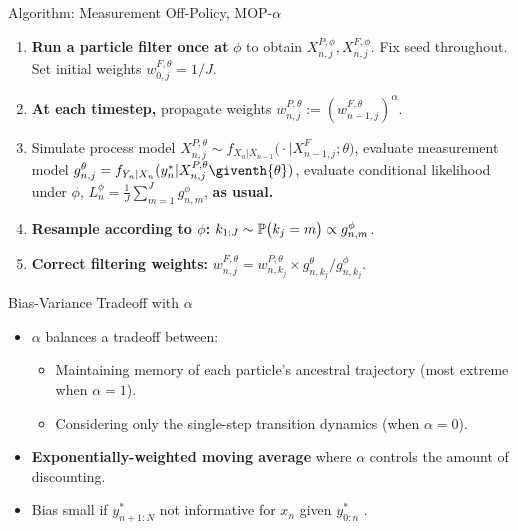 \documentclass{beamer}
\begin{document}
\begin{frame}{Algorithm: Measurement Off-Policy, MOP-$\alpha$}
    \begin{enumerate}
        \item \textbf{Run a particle filter once at} $\phi$ to obtain $X_{n,j}^{P,\phi}, X_{n,j}^{F,\phi}$. Fix seed throughout. Set initial weights $w_{0,j}^{F,\theta} = 1/J$.
        \item \pause \textbf{At each timestep,} propagate weights $w_{n,j}^{P,\theta} := (w_{n-1,j}^{F,\theta})^\alpha$. 
        \item \pause Simulate process model ${X}_{n,j}^{P,\theta}\sim {f}_{{X}_{n}|{X}_{n-1}}\big(\cdot|{X}_{n-1,j}^{F};{\theta}\big)$, evaluate measurement model $g^{\theta}_{n,j}={f}_{{Y}_{n}|{X}_{n}}(y_{n}^{*}|{X}_{n,j}^{P,\theta}\giventh{\theta})$, evaluate conditional likelihood under $\phi$, $L_n^{\phi} = \frac{1}{J}\sum_{m=1}^{J}g^{\phi}_{n,m}$, \textbf{as usual.}
        \item \pause \textbf{Resample according to $\phi$:} $k_{1:J} \sim \mathbb{P}\big(k_{j}=m\big) \propto g^{\phi}_{n,m}$.
        \item \pause \textbf{Correct filtering weights:} $\displaystyle w^{F,\theta}_{n,j}= w^{P,\theta}_{n,k_j} \times  g^{\theta}_{n,k_j}/ g^{\phi}_{n,k_j}$. 
    \end{enumerate}
    \pause 
\end{frame}


\begin{frame}{Bias-Variance Tradeoff with $\alpha$}
\begin{itemize}
    \item $\alpha$ balances a tradeoff between:
    \begin{itemize}
        \item \pause Maintaining memory of each particle's ancestral trajectory (most extreme when $\alpha=1$).
        \item \pause Considering only the single-step transition dynamics (when $\alpha=0$).
    \end{itemize}
    \item \pause\textbf{Exponentially-weighted moving average} where $\alpha$ controls the amount of discounting.
    \item \pause Bias small if $y_{n+1:N}^*$ not informative for $x_n$ given $y_{0:n}^*$ \citep{corenflos21}.
\end{itemize}
    
\end{frame}
\end{document}

